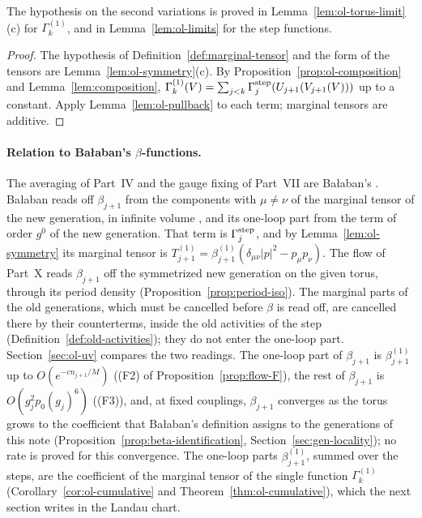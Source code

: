 The hypothesis on the second variations is proved in Lemma~\ref{lem:ol-torus-limit}(c) for $\Gamma^{(1)}_k$, and in Lemma~\ref{lem:ol-limits} for the step functions.

\begin{proof}
The hypothesis of Definition~\ref{def:marginal-tensor} and the form of the tensors are Lemma~\ref{lem:ol-symmetry}(c). By Proposition~\ref{prop:ol-composition} and Lemma~\ref{lem:composition}, $\Gamma^{(1)}_k(V)=\sum_{j<k}\Gamma^{\rm step}_j(U_{j+1}(V_{j+1}(V)))$ up to a constant. Apply Lemma~\ref{lem:ol-pullback} to each term; marginal tensors are additive.
\end{proof}

\paragraph{Relation to Ba\l aban's $\beta$-functions.} The averaging of Part~IV and the gauge fixing of Part~VII are Ba\l aban's \cite[(0.3)--(0.19)]{BalYM4I}. Ba\l aban reads off $\beta_{j+1}$ from the components with $\mu\ne\nu$ of the marginal tensor of the new generation, in infinite volume \cite[(1.20)--(1.22), (2.14)]{BalYM4I}, and its one-loop part from the term of order $g^0$ of the new generation. That term is $\Gamma^{\rm step}_j$, and by Lemma~\ref{lem:ol-symmetry} its marginal tensor is $T^{(1)}_{j+1}=\beta^{(1)}_{j+1}(\delta_{\mu\nu}|p|^2-p_\mu p_\nu)$. The flow of Part~X reads $\beta_{j+1}$ off the symmetrized new generation on the given torus, through its period density (Proposition~\ref{prop:period-iso}). The marginal parts of the old generations, which must be cancelled before $\beta$ is read off, are cancelled there by their counterterms, inside the old activities of the step (Definition~\ref{def:old-activities}); they do not enter the one-loop part. Section~\ref{sec:ol-uv} compares the two readings. The one-loop part of $\beta_{j+1}$ is $\beta^{(1)}_{j+1}$ up to $O(e^{-cn_{j+1}/M})$ ((F2) of Proposition~\ref{prop:flow-F}), the rest of $\beta_{j+1}$ is $O(g_j^2p_0(g_j)^6)$ ((F3)), and, at fixed couplings, $\beta_{j+1}$ converges as the torus grows to the coefficient that Ba\l aban's definition assigns to the generations of this note (Proposition~\ref{prop:beta-identification}, Section~\ref{sec:gen-locality}); no rate is proved for this convergence. The one-loop parts $\beta^{(1)}_{j+1}$, summed over the steps, are the coefficient of the marginal tensor of the single function $\Gamma^{(1)}_k$ (Corollary~\ref{cor:ol-cumulative} and Theorem~\ref{thm:ol-cumulative}), which the next section writes in the Landau chart.
